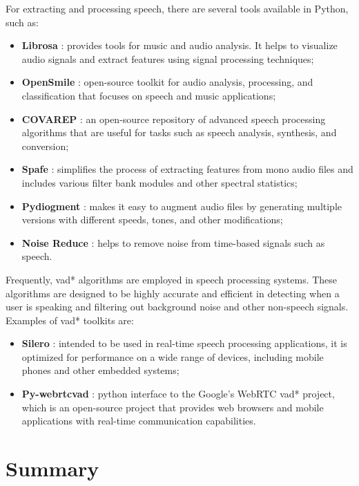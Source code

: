 For extracting and processing speech, there are several tools available in Python, such as:
\begin{itemize}
    \item \textbf{Librosa} \cite{Librosa}: provides tools for music and audio analysis. It helps to visualize audio signals and extract features using signal processing techniques;
    \item \textbf{OpenSmile} \cite{Eyben2010}: open-source toolkit for audio analysis, processing, and classification that focuses on speech and music applications;
    \item \textbf{COVAREP} \cite{Degottex2014}: an open-source repository of advanced speech processing algorithms that are useful for tasks such as speech analysis, synthesis, and conversion;
    \item \textbf{Spafe} \cite{spafe}: simplifies the process of extracting features from mono audio files and includes various filter bank modules and other spectral statistics;
    \item \textbf{Pydiogment} \cite{ayoubmalek2020}: makes it easy to augment audio files by generating multiple versions with different speeds, tones, and other modifications;
    \item \textbf{Noise Reduce} \cite{tim_sainburg_2019_3243139,sainburg2020finding}: helps to remove noise from time-based signals such as speech.
\end{itemize}

Frequently, \ac{vad*} algorithms are employed in speech processing systems. These algorithms are designed to be highly accurate and efficient in detecting when a user is speaking and filtering out background noise and other non-speech signals. Examples of \ac{vad*} toolkits are:

\begin{itemize}
    \item \textbf{Silero} \cite{SileroVAD}: intended to be used in real-time speech processing applications, it is optimized for performance on a wide range of devices, including mobile phones and other embedded systems;

    \item \textbf{Py-webrtcvad} \cite{WebRTCVad}: python interface to the Google's WebRTC \ac{vad*} project, which is an open-source project that provides web browsers and mobile applications with real-time communication capabilities.
\end{itemize}


\section{Summary}


